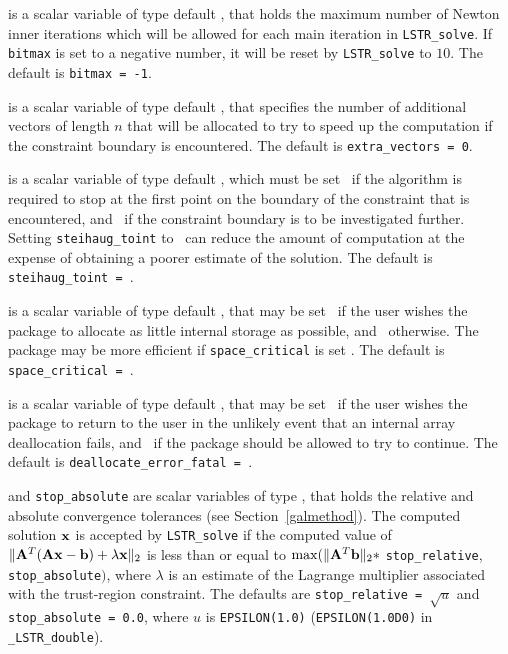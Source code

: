 \documentclass{galahad}
\newcommand{\packagename}{LS\-TR}
\newcommand{\fullpackagename}{\libraryname\_\packagename}
\begin{document}
\begin{description}
 is a scalar variable of type default \integer, that holds the
maximum number of Newton inner iterations which will be allowed for each
main iteration in {\tt \packagename\_solve}.
If {\tt bitmax} is set to a negative number, it will be reset by
{\tt \packagename\_solve} to $10$.
The default is {\tt bitmax = -1}.

 is a scalar variable of type default \integer,
that specifies the number of additional vectors of length $n$
that will be allocated to try to speed up the computation if the
constraint boundary  is encountered.
The default is {\tt extra\_vectors = 0}.

 is a scalar variable of type default \logical,
which must be set \true\ if the algorithm is required to stop at
the first point on the boundary of the constraint that is encountered,
and \false\  if the constraint boundary is to be investigated
further.  Setting {\tt steihaug\_toint} to \true\ can reduce the
amount of computation at the expense of obtaining a poorer estimate of
the solution.
The default is {\tt steihaug\_toint = \true}.

 is a scalar variable of type default \logical, that
may be set \true\ if the user wishes the package to allocate as little
internal storage as possible, and \false\ otherwise. The package may
be more efficient if {\tt space\_critical} is set \false.
The default is {\tt space\_critical = \false}.

 is a scalar variable of type default \logical,
that may be set \true\ if the user wishes the package to return to the user
in the unlikely event that an internal array deallocation fails,
and \false\ if the package should be allowed to try to continue.
The default is {\tt deallocate\_error\_fatal = \false}.

 and {\tt stop\_absolute} are scalar variables of type
\realdp, that holds the
relative and absolute convergence tolerances (see Section~\ref{galmethod}).
The computed solution ${\mathbf{x}}$ is accepted by {\tt \packagename\_solve}
if the computed value of
$\|{\mathbf{A}}^T ( {\mathbf{A}} {\mathbf{x}} - {\mathbf{b}} ) + \lambda {\mathbf{x}}\|_2$
is less than or equal
to $\max (\| {\mathbf{A}}^T {\mathbf{b}} \|_2 \ast$ {\tt stop\_relative},
{\tt stop\_absolute}$)$, where $\lambda$ is an estimate of the Lagrange
multiplier associated with the trust-region constraint.
The defaults are {\tt stop\_relative = $\sqrt{u}$} and
{\tt stop\_absolute = 0.0},
where $u$ is {\tt EPSILON(1.0)} ({\tt EPSILON(1.0D0)} in
{\tt \fullpackagename\_double}).


\end{description}
\end{document}
